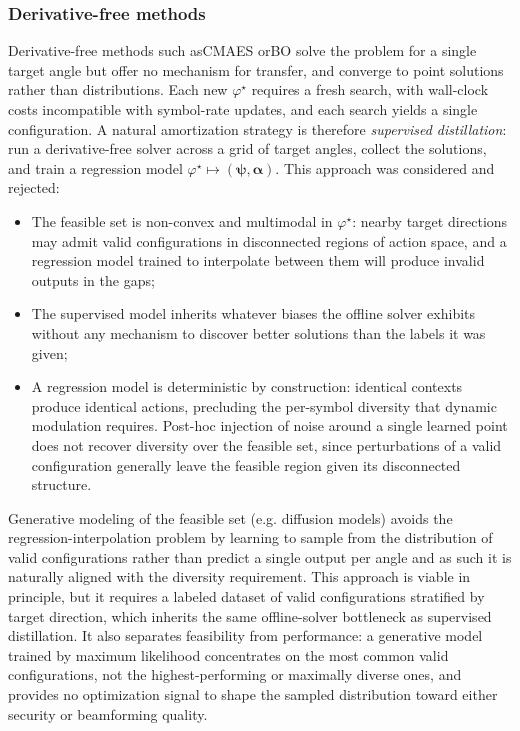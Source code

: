 \subsubsection{Derivative-free methods}
Derivative-free methods such as\gls{CMAES} or\gls{BO} solve the problem for a single target angle but offer no mechanism for transfer, and converge to point solutions rather than distributions. Each new $\varphi^\star$ requires a fresh search, with wall-clock costs incompatible with symbol-rate updates, and each search yields a single configuration. A natural amortization strategy is therefore \emph{supervised distillation}: run a derivative-free solver across a grid of target angles, collect the solutions, and train a regression model $\varphi^\star \mapsto (\boldsymbol{\psi}, \boldsymbol{\alpha})$. This approach was considered and rejected:
\begin{itemize}
    \item The feasible set is non-convex and multimodal in $\varphi^\star$: nearby target directions may admit valid configurations in disconnected regions of action space, and a regression model trained to interpolate between them will produce invalid outputs in the gaps;
    \item The supervised model inherits whatever biases the offline solver exhibits without any mechanism to discover better solutions than the labels it was given;
    \item A regression model is deterministic by construction: identical contexts produce identical actions, precluding the per-symbol diversity that dynamic modulation requires. Post-hoc injection of noise around a single learned point does not recover diversity over the feasible set, since perturbations of a valid configuration generally leave the feasible region given its disconnected structure.
\end{itemize}
Generative modeling of the feasible set (e.g. diffusion models) avoids the regression-interpolation problem by learning to sample from the distribution of valid configurations rather than predict a single output per angle and as such it is naturally aligned with the diversity requirement. This approach is viable in principle, but it requires a labeled dataset of valid configurations stratified by target direction, which inherits the same offline-solver bottleneck as supervised distillation. It also separates feasibility from performance: a generative model trained by maximum likelihood concentrates on the most common valid configurations, not the highest-performing or maximally diverse ones, and provides no optimization signal to shape the sampled distribution toward either security or beamforming quality.
